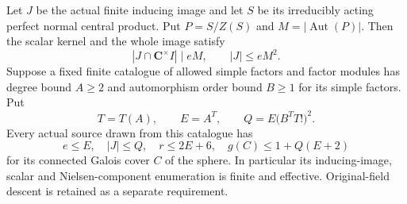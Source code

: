\begin{theorem}[HD-TC03]
Let $J$ be the actual finite inducing image and let $S$ be
its irreducibly acting perfect normal central product.
Put $P=S/Z(S)$ and $M=|\operatorname{Aut}(P)|$.
Then the scalar kernel and the whole image satisfy
\[
 |J\cap\mathbf C^\times I|\mid eM,
 \qquad |J|\le eM^2.                                    \tag{TC.9}
\]
Suppose a fixed finite catalogue of allowed simple factors
and factor modules has degree bound $A\ge2$ and automorphism
order bound $B\ge1$ for its simple factors. Put
\[
 T=T(A),\qquad E=A^T,\qquad
 Q=E\bigl(B^T T!\bigr)^2.                               \tag{TC.10}
\]
Every actual source drawn from this catalogue has
\[
 e\le E,\quad |J|\le Q,\quad r\le2E+6,
 \quad g(C)\le1+Q(E+2)                                 \tag{TC.11}
\]
for its connected Galois cover $C$ of the sphere.
In particular its inducing-image, scalar and Nielsen-component
enumeration is finite and effective. Original-field descent
is retained as a separate requirement.
\end{theorem}

